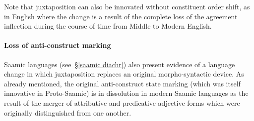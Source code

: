 {Note that juxtaposition can also be innovated without constituent order shift, as in English where the change is a result of the complete loss of the agreement inflection during the course of time from Middle to Modern English. 

\paragraph{Loss of anti-construct marking}
Saamic languages (see~\S\ref{saamic diachr}) also present evidence of a language change in which juxtaposition replaces an original morpho-syntactic device. As already mentioned, the original anti-construct state marking (which was itself innovative in Proto-Saamic) is in dissolution in modern Saamic languages as the result of the merger of attributive and predicative adjective forms which were originally distinguished from one another.

}
